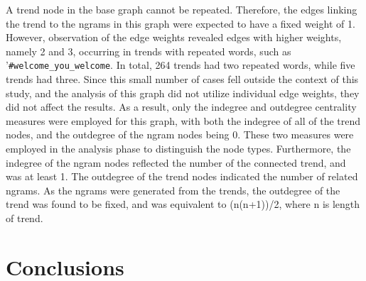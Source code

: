 \documentclass[conference]{IEEEtran}
\begin{document}
A trend node in the base graph cannot be repeated. Therefore, the edges linking 
the trend to the ngrams in this graph were expected to have a fixed weight of 1. 
However, observation of the edge weights revealed edges with higher weights, namely 
2 and 3, occurring in trends with repeated words, such as '{\texttt{\#welcome\_you\_welcome}}.
In total, 264 trends had two repeated words, while five trends had three. Since this small number 
of cases fell outside the context of this study, and the analysis of this graph did not utilize individual 
edge weights, they did not affect the results. As a result, only the indegree and outdegree 
centrality measures were employed for this graph, with both the indegree of all of the trend nodes, 
and the outdegree of the ngram nodes being 0. These two measures were employed in the analysis 
phase to distinguish the node types. Furthermore, the indegree of the ngram nodes reflected the 
number of the connected trend, and was at least 1. The outdegree of the trend nodes indicated 
the number of related ngrams. As the ngrams were generated from the trends, the outdegree of 
the trend was found to be fixed, and was equivalent to (n(n+1))/2, where n is length of trend.


\section{Conclusions}\label{conclusions}




\end{document}
